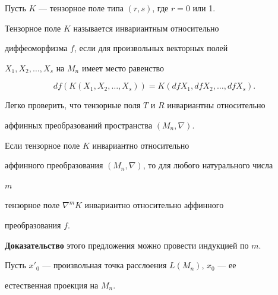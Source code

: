  


Пусть $K$ --- тензорное поле типа $(r,s)$, где $r=0$ или 1.  


 


\begin{defns} 


Тензорное поле $K$ называется инвариантным относительно  


диффеоморфизма $f$, если для произвольных векторных полей  


$X_1,X_2,\dotsc,X_s$ на $M_n$ имеет место равенство 


$$ 


df(K(X_1,X_2,\dotsc,X_s))=K(df X_1,df X_2,\dotsc,df X_s). 


$$ 


\end{defns} 


 


 


Легко проверить, что тензорные поля $T$ и $R$ инвариантны относительно  


аффинных преобразований пространства $(M_n,\nabla)$. 


 


\begin{props} 


Если тензорное поле $K$ инвариантно относительно  


аффинного преобразования $(M_n,\nabla)$, то для любого натурального числа 


$m$ 


тензорное поле $\nabla^m K$ инвариантно относительно аффинного 


преобразования $f$. 


\end{props} 


 


 


{\bf Доказательство} этого предложения можно провести индукцией по $m$. 


 


 


Пусть $x'_0$ --- произвольная точка расслоения $L(M_n)$, $x_0$ --- ее 


естественная  проекция на $M_n$. 


 


 


